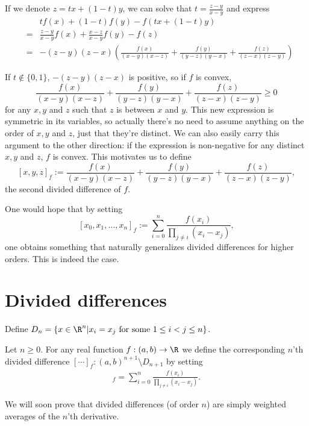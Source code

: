If we denote $z = t x + (1 - t) y$, we can solve that $t = \frac{z - y}{x - y}$ and express
\begin{eqnarray*}
	&& t f(x) + (1 - t) f(y) - f(t x + (1 - t)y) \\
	&=& \frac{z - y}{x - y} f(x) + \frac{x - z}{x - y} f(y) - f(z) \\
	&=& -(z - y)(z - x) \left(\frac{f(x)}{(x - y)(x - z)} + \frac{f(y)}{(y - z)(y - x)} + \frac{f(z)}{(z - x)(z - y)} \right)
\end{eqnarray*}

If $t \notin \{0, 1\}$, $-(z - y)(z - x)$ is positive, so if $f$ is convex,
\[
	\frac{f(x)}{(x - y)(x - z)} + \frac{f(y)}{(y - z)(y - x)} + \frac{f(z)}{(z - x)(z - y)} \geq 0
\]
for any $x, y$ and $z$ such that $z$ is between $x$ and $y$. This new expression is symmetric in its variables, so actually there's no need to assume anything on the order of $x, y$ and $z$, just that they're distinct. We can also easily carry this argument to the other direction: if the expression is non-negative for any distinct $x, y$ and $z$, $f$ is convex. This motivates us to define
\[
	[x, y, z]_{f} := \frac{f(x)}{(x - y)(x - z)} + \frac{f(y)}{(y - z)(y - x)} + \frac{f(z)}{(z - x)(z - y)},
\]
the second divided difference of $f$.

One would hope that by setting
\[ 
	[x_{0}, x_{1}, \ldots, x_{n}]_{f} := \sum_{i = 0}^{n} \frac{f(x_{i})}{\prod_{j \neq i} (x_{i} - x_{j})},
\]
one obtains something that naturally generalizes divided differences for higher orders. This is indeed the case.

\section{Divided differences}

Define $D_{n} = \{x\in \R^{n} | x_{i} = x_{j} \text{ for some $1 \leq i < j \leq n$}\}$.
\begin{maar}
Let $n \geq 0$. For any real function $f : (a, b) \to \R$ we define the corresponding $n$'th divided difference $[\cdots]_{f} : (a, b)^{n + 1} \setminus D_{n + 1}$ by setting
\begin{align*}
	[x_{0}, x_{1}, \ldots, x_{n}]_{f} = \sum_{i = 0}^{n} \frac{f(x_{i})}{\prod_{j \neq i} (x_{i} - x_{j})}.
\end{align*}
\end{maar}

We will soon prove that divided differences (of order $n$) are simply weighted averages of the $n$'th derivative.

